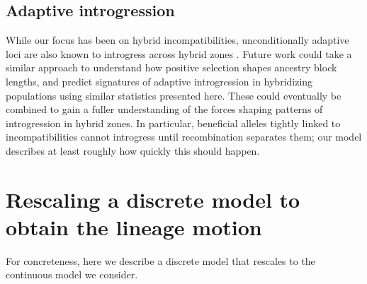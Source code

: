\documentclass[11pt,letterpaper]{article}
\newcommand{\plr}[1]{{\em \color{blue} #1}}
\begin{document}
\subsection*{Adaptive introgression}

While our focus has been on hybrid incompatibilities, 
unconditionally adaptive loci are also known to introgress across hybrid zones \citep{Barton1986,martinsen2001hybrid,arnold2004transfer}. 
Future work could take a similar approach to understand how positive selection shapes ancestry block lengths, and predict  signatures of adaptive introgression in hybridizing populations using similar statistics presented here. These could eventually be combined to gain a fuller understanding of the forces shaping patterns of introgression in hybrid zones. 
In particular, beneficial alleles tightly linked to incompatibilities
cannot introgress until recombination separates them;
our model describes at least roughly how quickly this should happen.






\appendix
\setcounter{table}{0}
\renewcommand{\thetable}{S\arabic{table}}
\setcounter{figure}{0}
\renewcommand{\thefigure}{S\arabic{figure}}


\section{Rescaling a discrete model to obtain the lineage motion}
\label{apx:lineage_derivation}

For concreteness, here we describe a discrete model that rescales to the continuous model we consider.
\end{document}
